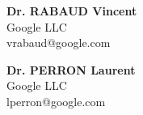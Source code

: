 \textbf{Dr. RABAUD Vincent}\\
Google LLC \\
vrabaud@google.com

\textbf{Dr. PERRON Laurent}\\
Google LLC \\
lperron@google.com
